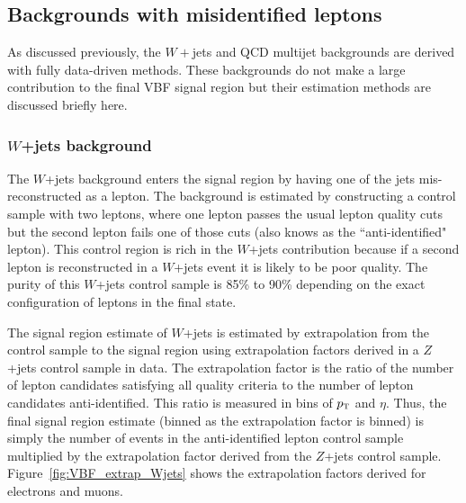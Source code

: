 \subsection{Backgrounds with misidentified leptons}

As discussed previously, the $W+$jets and QCD multijet backgrounds are derived with fully data-driven methods. These backgrounds do not make a large contribution to the final VBF signal region but their estimation methods are discussed briefly here.

\subsubsection{$W$+jets background}

The $W$+jets background enters the signal region by having one of the jets mis-reconstructed as a lepton. The background is estimated by constructing a control sample with two leptons, where one lepton passes the usual lepton quality cuts but the second lepton fails one of those cuts (also knows as the ``anti-identified" lepton). This control region is rich in the $W$+jets contribution because if a second lepton is reconstructed in a $W$+jets event it is likely to be poor quality. The purity of this $W$+jets control sample is 85\% to 90\% depending on the exact configuration of leptons in the final state.

The signal region estimate of $W$+jets is estimated by extrapolation from the control sample to the signal region using extrapolation factors derived in a $Z$+jets control sample in data. The extrapolation factor is the ratio of the number of lepton candidates satisfying all quality criteria to the number of lepton candidates anti-identified. This ratio is measured in bins of $p_{\textrm{\footnotesize\sc t}}$ and $\eta$. Thus, the final signal region estimate (binned as the extrapolation factor is binned) is simply the number of events in the anti-identified lepton control sample multiplied by the extrapolation factor derived from the $Z$+jets control sample. Figure~\ref{fig:VBF_extrap_Wjets} shows the extrapolation factors derived for electrons and muons. 


